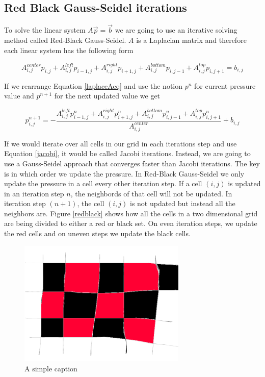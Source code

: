 \subsection{Red Black Gauss-Seidel iterations}

To solve the linear system $A\vec{p} = \vec{b}$ we are going to use an iterative solving method called Red-Black Gauss-Seidel. $A$ is a Laplacian matrix and therefore each linear system has the following form

\begin{equation}
{A}^{center}_{i,j} p_{i,j} + {A}^{left}_{i,j} p_{i-1,j} + {A}^{right}_{i,j} p_{i+1,j} + {A}^{bottom}_{i,j} p_{i,j-1} + {A}^{top}_{i,j} p_{i,j+1} = b_{i,j}
\label{laplaceAeq}
\end{equation}

If we rearrange Equation \ref{laplaceAeq} and use the notion $p^n$ for current pressure value and $p^{n+1}$ for the next updated value we get

\begin{equation}
{p}^{n+1}_{i,j}  = -\frac{ {A}^{left}_{i,j} {p}^{n}_{i-1,j} + {A}^{right}_{i,j} {p}^{n}_{i+1,j} + {A}^{bottom}_{i,j} {p}^{n}_{i,j-1} + {A}^{top}_{i,j} {p}^{n}_{i,j+1}}{{A}^{center}_{i,j}} + b_{i,j}
\label{jacobi}
\end{equation}

If we would iterate over all cells in our grid in each iterations step and use Equation \ref{jacobi}, it would be called Jacobi iterations. Instead, we are going to use a Gauss-Seidel approach that converges faster than Jacobi iterations. The key is in which order we update the pressure. In Red-Black Gauss-Seidel we only update the pressure in a cell every other iteration step. If a cell $(i,j)$ is updated in an iteration step $n$, the neighbords of that cell will not be updated. In iteration step $(n+1)$, the cell $(i,j)$ is not updated but instead all the neighbors are. Figure \ref{redblack} shows how all the cells in a two dimensional grid are being divided to either a red or black set. On even iteration steps, we update the red cells and on uneven steps we update the black cells.

\begin{figure}[ht!]
\centering
\includegraphics[width=80mm]{img/redblack.png}
\caption{A simple caption}
\label{createexample}
\end{figure}
